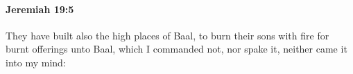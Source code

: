 
		\paragraph{Jeremiah 19:5} %
			\label{JEREMIAH-19-5}

			They have built also the high places of Baal, to burn their sons with fire for burnt offerings unto Baal, which I commanded not, nor spake it, neither came it into my mind:



